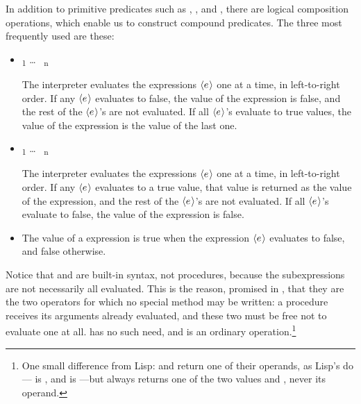 In addition to primitive predicates such as \code{<}, \code{=}, and \code{>},
there are logical composition operations, which enable us to construct compound
predicates. The three most frequently used are these:

\begin{itemize}
\item
{}\textsubscript{1}  \dots\  \textsubscript{n}

The interpreter evaluates the expressions \( \langle{e}\kern0.08em\rangle \) one at a time, in
left-to-right order.  If any \( \langle{e}\kern0.08em\rangle \) evaluates to false, the value of the
 expression is false, and the rest of the \( \langle{e}\kern0.08em\rangle \)'s are not
evaluated.  If all \( \langle{e}\kern0.08em\rangle \)'s evaluate to true values, the value of the
 expression is the value of the last one.

\item
{}\textsubscript{1}  \dots\  \textsubscript{n}

The interpreter evaluates the expressions \( \langle{e}\kern0.08em\rangle \) one at a time, in
left-to-right order.  If any \( \langle{e}\kern0.08em\rangle \) evaluates to a true value, that value is
returned as the value of the  expression, and the rest of the
\( \langle{e}\kern0.08em\rangle \)'s are not evaluated.  If all \( \langle{e}\kern0.08em\rangle \)'s evaluate to false, the value
of the  expression is false.

\item
{} 

The value of a  expression is true when the expression \( \langle{e}\kern0.08em\rangle \)
evaluates to false, and false otherwise.
\end{itemize}

\noindent
Notice that  and  are built-in syntax, not procedures,
because the subexpressions are not necessarily all evaluated.  This is the
reason, promised in , that they are the two operators for
which no special method may be written: a procedure receives its arguments
already evaluated, and these two must be free not to evaluate one at all.
 has no such need, and is an ordinary operation.\footnote{One small
difference from Lisp:  and  return one of their operands, as
Lisp's do--- is , and  is ---but
 always returns one of the two values  and ,
never its operand.}

